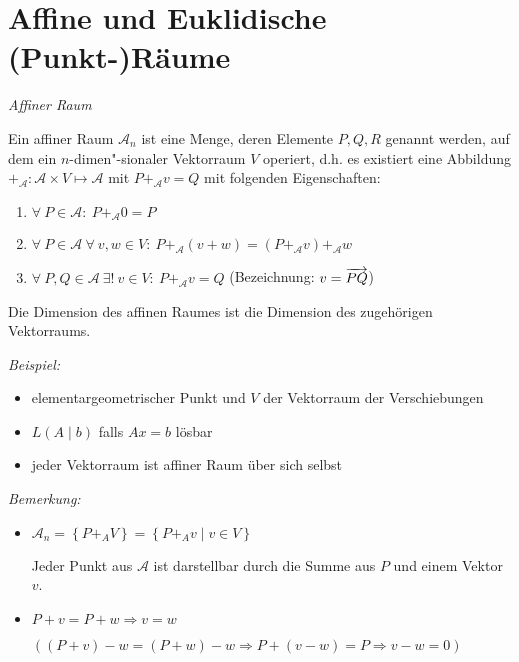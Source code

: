 \section{Affine und Euklidische (Punkt-)Räume} %
\label{sec:Affine und Euklidische (Punkt-)Räume}

\begin{mydef}\textit{Affiner Raum}\medskip

    Ein affiner Raum $\mathcal{A}_n$ ist eine Menge, deren Elemente $P,Q,R$ genannt werden, auf dem ein $n$-dimen"-sionaler Vektorraum $V$ operiert,
    d.h. es existiert eine Abbildung $+_{\mathcal{A}}: \mathcal{A} \times V \mapsto \mathcal{A}$ mit $P +_{\mathcal{A}} v = Q$ mit folgenden Eigenschaften:
    \begin{enumerate}[label=(\roman*)]
        \item \label{EigaffRaum1} $\forall\ P \in \mathcal{A}:\ P +_{\mathcal{A}} 0 = P$
        \item \label{EigaffRaum2} $\forall\ P \in \mathcal{A}\ \forall \ v,w \in V:\ P +_{\mathcal{A}} (v + w) = (P +_{\mathcal{A}} v) +_{\mathcal{A}} w$
        \item \label{EigaffRaum3} $\forall\ P,Q \in \mathcal{A}\ \exists! \ v \in V:\ P +_{\mathcal{A}} v  = Q$ \hfill (Bezeichnung: $v = \overrightarrow{PQ}$)
    \end{enumerate}
    Die Dimension des affinen Raumes ist die Dimension des zugehörigen Vektorraums.
\end{mydef}

\textit{Beispiel:}
\begin{itemize}
    \item elementargeometrischer Punkt und $V$ der Vektorraum der Verschiebungen
    \item $L(A \mid b)$ falls $Ax = b$ lösbar
    \item jeder Vektorraum ist affiner Raum über sich selbst
\end{itemize}

\textit{Bemerkung:}
\begin{itemize}
    \item $\mathcal{A}_n = \left\{ P +_A V \right\} = \left\{ P +_A v \mid v \in V \right\}$

        Jeder Punkt aus $\mathcal{A}$ ist darstellbar durch die Summe aus $P$ und einem Vektor $v$.
    \item $P + v = P + w \Rightarrow v = w$

        $\left( (P+v)-w = (P+w)-w \Rightarrow P + (v-w) = P \Rightarrow v-w = 0 \right)$
\end{itemize}

